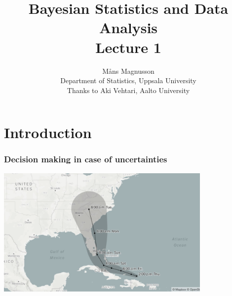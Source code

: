 \documentclass[10pt]{beamer}
\title[]{{\color{black}Bayesian Statistics and Data Analysis \\ Lecture 1}}
\author[]{M{\aa}ns Magnusson \\ Department of Statistics, Uppsala University \\ Thanks to Aki Vehtari, Aalto University}
\date{}
\begin{document}
\frame{\titlepage
}



\section{Introduction}
\frame{\sectionpage}

\begin{frame}

  \frametitle{Decision making in case of uncertainties}

  \begin{center}
    \includegraphics[width=10.5cm]{figs/irma.png}
  \end{center}
\end{frame}
\end{document}
